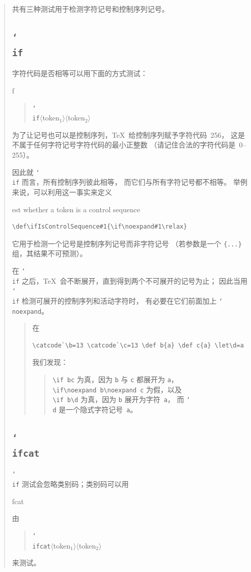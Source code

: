 \documentclass[a4paper]{rapport3}
\makeatletter
\def\nl{\protect\\}\def\n#1{{\tt #1}}\def\cs#1{{\tt\char`\\#1}}\let\csc\cs
\def\gr#1{$\langle$#1$\rangle$}\def\key#1{{\tt#1}}
\newenvironment{disp}{\begin{quotation}}{\end{quotation}}
\newenvironment{Disp}{\begin{quotation}}{\end{quotation}}
\newenvironment{tdisp}{\begin{quotation}}{\end{quotation}}
\newenvironment{example}{\begin{quotation}}{\end{quotation}}
\def\howto#1\par{}
\def\cstoidx#1\par{\index{#1@\cs{#1}}}
\makeatother
\begin{document}
\begin{disp}
共有三种测试用于检测字符记号和控制序列记号。

\subsection{\cs{if}}

字符代码是否相等可以用下面的方式测试：
\cstoidx if\par
\begin{Disp}\cs{if}\gr{token$_1$}\gr{token$_2$}\end{Disp}
为了让记号也可以是控制序列，\TeX\ 给控制序列赋予字符代码~256，
这是不属于任何字符记号字符代码的最小正整数
（请记住合法的字符代码是~0--255）。

因此就 \cs{if} 而言，所有控制序列彼此相等，
而它们与所有字符记号都不相等。
举例来说，可以利用这一事实来定义
\howto Test whether a token is a control sequence\par
\begin{verbatim}
\def\ifIsControlSequence#1{\if\noexpand#1\relax}
\end{verbatim}
它用于检测一个记号是控制序列记号而非字符记号
（若参数是一个 \verb>{...}> 组，其结果不可预测）。

在 \cs{if} 之后，\TeX\ 会不断展开，直到得到两个不可展开的记号为止；
因此当用 \cs{if} 检测可展开的控制序列和活动字符时，
有必要在它们前面加上 \cs{noexpand}。

\begin{example} 在
\begin{verbatim}
\catcode`\b=13 \catcode`\c=13 \def b{a} \def c{a} \let\d=a
\end{verbatim}
我们发现：
\begin{tdisp}
\verb-\if bc- 为真，因为 \n b 与 \n c 都展开为 \n a，\nl
\verb-\if\noexpand b\noexpand c- 为假，以及\nl
\verb-\if b\d- 为真，因为 \n{b} 展开为字符~\n{a}，
   而 \cs{d} 是一个隐式字符记号~\n{a}。
\end{tdisp}
\end{example}

\subsection{\cs{ifcat}}

\cs{if} 测试会忽略类别码；类别码可以用
\cstoidx ifcat\par
由 \begin{Disp}\cs{ifcat}\gr{token$_1$}\gr{token$_2$}\end{Disp}
来测试。


\end{disp}
\end{document}
